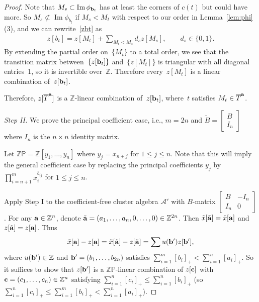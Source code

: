 \documentclass[pdftex]{sigma}
\numberwithin{equation}{section}
\DeclareMathOperator{\Ima}{Im}
\begin{document}
\begin{proof}
Note that $M_s \subset \Ima \phi_{{\bf b}_t}$ has at least the corners of $c(t)$ but could have more. So $M_s \not\subset \Ima\phi_{b_t}$ if $M_s < M_t$ with respect to our order in Lemma~\ref{lem:phi}(3), and we can rewrite~\eqref{zbt} as
\begin{gather*}
z[b_t]=z[M_t]+\sum_{M_t<M_s} d_sz[M_s], \qquad d_s\in\{0,1\}.
 \end{gather*}
 By extending the partial order on~$\{M_t\}$ to a total order, we see that the transition matrix between~$\{z[{\bf b}_t]\}$ and~$\{z[M_t]\}$ is triangular with all diagonal entries~1, so it is invertible over~$\mathbb{Z}$.
Therefore every~$z[M_t]$ is a linear combination of~$z[{\bf b}_t]$.

Therefore, $z[\overline{T}^{\bf a}]$ is a $\mathbb{Z}$-linear combination of~$z[{\bf b}_t]$, where~$t$ satisf\/ies $M_t \in \overline{T}^{\bf a}$.


\emph{Step II.} We prove the principal coefficient case, i.e., $m=2n$ and $\tilde{B}=\begin{bmatrix}
B\\ I_n
\end{bmatrix}$ where $I_n$ is the $n\times n$ identity matrix.


Let   $\mathbb{ZP}=\mathbb{Z}[y_1,\dots,y_n]$ where $y_j=x_{n+j}$ for $1\le j\le n$.
Note that this will imply the general coef\/f\/icient case by replacing the principal coef\/f\/icients $y_j$ by $\prod\limits_{i=n+1}^mx_i^{b_{ij}}$ for $1\le j\le n$.

Apply Step I to the coef\/f\/icient-free cluster algebra $\mathcal{A}'$ with $B$-matrix
$\begin{bmatrix}
B&-I_n\\
I_n&0
\end{bmatrix}$. For any ${\bf a}\in\mathbb{Z}^n$, denote $\tilde{\bf a}=(a_1,\dots,a_n,0,\dots,0)\in\mathbb{Z}^{2n}$. Then $\tilde{x}[\tilde{\bf a}]=\tilde{x}[{\bf a}]$ and $z[\tilde{\bf a}]=z[{\bf a}]$. Thus
\begin{gather*}
 \tilde{x}[{\bf a}] - z[{\bf a}]=\tilde{x}[\tilde{\bf a}] - z[\tilde{\bf a}] = \sum u({\bf b}') z[{\bf b}'],
 \end{gather*}
where $u({\bf b}') \in \mathbb{Z}$ and ${\bf b}'=(b_1,\dots,b_{2n})$ satisf\/ies $\sum\limits_{i=1}^m [b_i]_+<\sum\limits_{i=1}^n[a_i]_+$. So it suf\/f\/ices to show that $z[{\bf b}']$ is a $\mathbb{ZP}$-linear combination of $z[{\bf c}]$ with ${\bf c}=(c_1,\dots,c_n)\in \mathbb{Z}^n$ satisfying $\sum\limits_{i=1}^n[c_i]_+\le \sum\limits_{i=1}^n[b_i]_+$ (so $\sum\limits_{i=1}^n[c_i]_+\le \sum\limits_{i=1}^m[b_i]_+<\sum\limits_{i=1}^n[a_i]_+$).


\end{proof}
\end{document}
